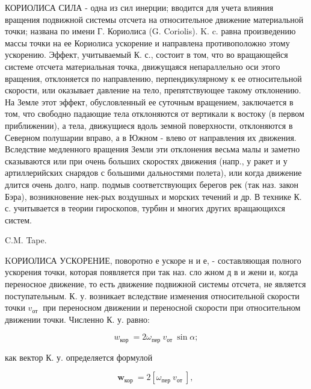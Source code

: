 \documentclass[10pt]{article}
\begin{document}
КОРИОЛИСА СИЛА - одна из сил инерции; вводится для учета влияния вращения подвижной системы отсчета на относительное движение материальной точки; названа по имени Г. Кориолиса (G. Coriolis). K. c. равна произведению массы точки на ее Кориолиса ускорение и направлена противоположно этому ускорению. Эффект, учитываемый К. с., состоит в том, что во вращающейся системе отсчета материальная точка, движущаяся непараллельно оси этого вращения, отклоняется по направлению, перпендикулярному к ее относительной скорости, или оказывает давление на тело, препятствующее такому отклонению. На Земле этот эффект, обусловленный ее суточным вращением, заключается в том, что свободно падающие тела отклоняются от вертикали к востоку (в первом приближении), а тела, движущиеся вдоль земной поверхности, отклоняются в Северном полушарии вправо, а в Южном - влево от направления их движения. Вследствие медленного вращения Земли эти отклонения весьма малы и заметно сказываются или при очень больших скоростях движения (напр., у ракет и у артиллерийских снарядов с большими дальностями полета), или когда движение длится очень долго, напр. подмыв соответствующих берегов рек (так наз. закон Бэра), возникновение нек-рых воздушных и морских течений и др. В технике К. с. учитывается в теории гироскопов, турбин и многих других вращающихся систем.



C.M. Tape.



KОРИОЛИСА УСКОРЕНИЕ, поворотно е ускоре н и е, - составляющая полного ускорения точки, которая появляется при так наз. сло жном д в и жени и, когда переносное движение, то есть движение подвижной системы отсчета, не является поступательным. К. у. возникает вследствие изменения относительной скорости точки $v_{\text {от }}$ при переносном движении и переносной скорости при относительном движении точки. Численно К. у. равно:



\[

w_{\text {кор }}=2 \omega_{\text {пер }} v_{\text {от }} \sin \alpha ;

\]



как вектор К. у. определяется формулой



\[

\boldsymbol{w}_{\text {кор }}=2\left[\omega_{\text {пер }} v_{\text {от }}\right] \text {, }

\]
\end{document}
